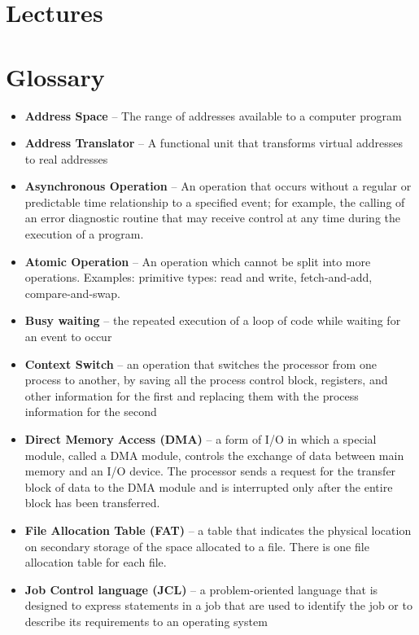 \documentclass[fontsize=5pt]{scrartcl}
\begin{document}
\begin{multicols}{3}
      
  \section{Lectures}
    
      
  \section{Glossary}
    \begin{itemize}
      \item \textbf{Address Space} – The range of addresses available to a computer program
      \item \textbf{Address Translator} – A functional unit that transforms virtual addresses to real addresses
      \item \textbf{Asynchronous Operation} – An operation that occurs without a regular or predictable time relationship to a specified event; 
                              for example, the calling of an error diagnostic routine that may receive control at any time during the execution of a program.
      \item \textbf{Atomic Operation} – An operation which cannot be split into more operations. Examples: primitive types: read and write, fetch-and-add, compare-and-swap. 
      \item \textbf{Busy waiting} – the repeated execution of a loop of code while waiting for an event to occur
      \item \textbf{Context Switch} – an operation that switches the processor from one process to another, by saving all the process control block, registers, and other information for the first and 
                                      replacing them with the process information for the second
      \item \textbf{Direct Memory Access (DMA)} – a form of I/O in which a special module, called a DMA module, controls the exchange of data between main memory and an I/O device.  
                                  The processor sends a request for the transfer block of data to the DMA module and is interrupted only after the entire block has been transferred.
      \item \textbf{File Allocation Table (FAT)} – a table that indicates the physical location on secondary storage of the space allocated to a file.  There is one file allocation table for each file.
      \item \textbf{Job Control language (JCL)} – a problem-oriented language that is designed to express statements in a job that are used to identify the job or to describe its requirements to an operating system

\end{itemize}
\end{multicols}
\end{document}
